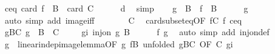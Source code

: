 \begin{isabellebody}
\ ceq{\isacharcolon}{\kern0pt}\ {\isachardoublequoteopen}card\ {\isacharparenleft}{\kern0pt}f\ {\isacharbackquote}{\kern0pt}\ B{\isacharparenright}{\kern0pt}\ {\isacharequal}{\kern0pt}\ card\ C{\isachardoublequoteclose}\isanewline
\ \ \ \ \isamarkupfalse%
\ d\ \isamarkupfalse%
\ simp\isanewline
\ \ \isamarkupfalse%
\ {\isachardoublequoteopen}g\ {\isacharbackquote}{\kern0pt}\ B\ {\isacharequal}{\kern0pt}\ f\ {\isacharbackquote}{\kern0pt}\ B{\isachardoublequoteclose}\isanewline
\ \ \ \ \isamarkupfalse%
\ g{\isacharparenleft}{\kern0pt}{}{\isacharparenright}{\kern0pt}\ \isamarkupfalse%
\ {\isacharparenleft}{\kern0pt}auto\ simp\ add{\isacharcolon}{\kern0pt}\ image{\isacharunderscore}{\kern0pt}iff{\isacharparenright}{\kern0pt}\isanewline
\ \ \isamarkupfalse%
\ \isamarkupfalse%
\ {\isachardoublequoteopen}{\isasymdots}\ {\isacharequal}{\kern0pt}\ C{\isachardoublequoteclose}\ \isamarkupfalse%
\ card{\isacharunderscore}{\kern0pt}subset{\isacharunderscore}{\kern0pt}eq{\isacharbrackleft}{\kern0pt}OF\ fC\ f{\isacharparenleft}{\kern0pt}{}{\isacharparenright}{\kern0pt}\ ceq{\isacharbrackright}{\kern0pt}\ \isacommand{{\isachardot}{\kern0pt}}\isamarkupfalse%
\isanewline
\ \ \isamarkupfalse%
\ \isamarkupfalse%
\ gBC{\isacharcolon}{\kern0pt}\ {\isachardoublequoteopen}g\ {\isacharbackquote}{\kern0pt}\ B\ {\isacharequal}{\kern0pt}\ C{\isachardoublequoteclose}\ \isacommand{{\isachardot}{\kern0pt}}\isamarkupfalse%
\isanewline
\ \ \isamarkupfalse%
\ gi{\isacharcolon}{\kern0pt}\ {\isachardoublequoteopen}inj{\isacharunderscore}{\kern0pt}on\ g\ B{\isachardoublequoteclose}\isanewline
\ \ \ \ \isamarkupfalse%
\ f{\isacharparenleft}{\kern0pt}{}{\isacharparenright}{\kern0pt}\ g{\isacharparenleft}{\kern0pt}{}{\isacharparenright}{\kern0pt}\ \isamarkupfalse%
\ {\isacharparenleft}{\kern0pt}auto\ simp\ add{\isacharcolon}{\kern0pt}\ inj{\isacharunderscore}{\kern0pt}on{\isacharunderscore}{\kern0pt}def{\isacharparenright}{\kern0pt}\isanewline
\ \ \isamarkupfalse%
\ g{}\ {\isacharequal}{\kern0pt}\ linear{\isacharunderscore}{\kern0pt}indep{\isacharunderscore}{\kern0pt}image{\isacharunderscore}{\kern0pt}lemma{\isacharbrackleft}{\kern0pt}OF\ g{\isacharparenleft}{\kern0pt}{}{\isacharparenright}{\kern0pt}\ fB{\isacharcomma}{\kern0pt}\ unfolded\ gBC{\isacharcomma}{\kern0pt}\ OF\ C{\isacharparenleft}{\kern0pt}{}{\isacharparenright}{\kern0pt}\ gi{\isacharbrackright}{\kern0pt}\isanewline

\end{isabellebody}
